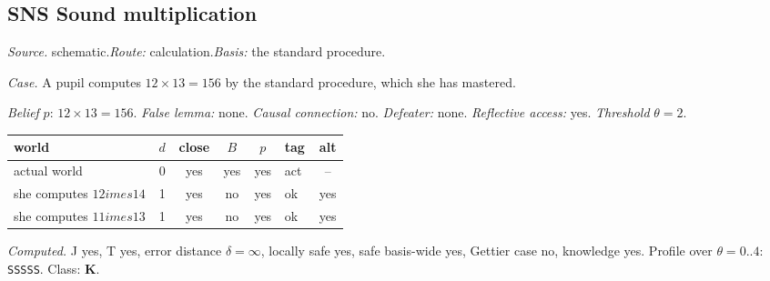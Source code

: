 \subsection*{SNS \enspace Sound multiplication}
\noindent\textit{Source.} schematic.\quad \textit{Route:} calculation.\quad \textit{Basis:} the standard procedure.\par
\noindent\textit{Case.} A pupil computes $12 \times 13 = 156$ by the standard procedure, which she has mastered.\par
\noindent\textit{Belief} $p$: $12 \times 13 = 156$.
 \textit{False lemma:} none. \textit{Causal connection:} no. \textit{Defeater:} none. \textit{Reflective access:} yes. \textit{Threshold} $\theta = 2$.\par
\begin{center}\begin{tabular}{@{}p{0.43\linewidth}rccclc@{}}
world & $d$ & close & $B$ & $p$ & tag & alt \\ \midrule
actual world & 0 & yes & yes & yes & act & -- \\
she computes $12 	imes 14$ & 1 & yes & no & yes & ok & yes \\
she computes $11 	imes 13$ & 1 & yes & no & yes & ok & yes \\
\end{tabular}\end{center}
\noindent\textit{Computed.} J yes, T yes, error distance $\delta = \infty$, locally safe yes, safe basis-wide yes, Gettier case no, knowledge yes. Profile over $\theta = 0..4$: \texttt{SSSSS}. Class: \textbf{K}.
\par\medskip
{}
